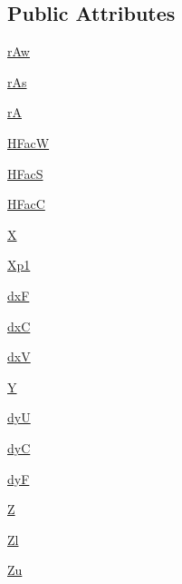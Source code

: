 \subsection*{Public Attributes}
\begin{DoxyCompactItemize}
\item 
\hyperlink{classmitgcm_1_1core_1_1Grid_adbed7b029a384434aca96fc553ded624}{r\+Aw}
\item 
\hyperlink{classmitgcm_1_1core_1_1Grid_a39b86150afe4e5d57702c86329cf3280}{r\+As}
\item 
\hyperlink{classmitgcm_1_1core_1_1Grid_adc031f161f566cb07d37c5a8a24b7e17}{r\+A}
\item 
\hyperlink{classmitgcm_1_1core_1_1Grid_a8c2c688d2378fe573e6e05db31c17cd2}{H\+Fac\+W}
\item 
\hyperlink{classmitgcm_1_1core_1_1Grid_a684f5d212fd29f4eb3432b491b95a82c}{H\+Fac\+S}
\item 
\hyperlink{classmitgcm_1_1core_1_1Grid_a757d09330b819c4650085004dede249e}{H\+Fac\+C}
\item 
\hyperlink{classmitgcm_1_1core_1_1Grid_a7787160106944191d5a4663774854f49}{X}
\item 
\hyperlink{classmitgcm_1_1core_1_1Grid_ab776eda0111565ec823081cfb9654867}{Xp1}
\item 
\hyperlink{classmitgcm_1_1core_1_1Grid_a39285f6f566718178d156838e1c10ee7}{dx\+F}
\item 
\hyperlink{classmitgcm_1_1core_1_1Grid_a5df9ec1a09a18057a0f2f9459fac9375}{dx\+C}
\item 
\hyperlink{classmitgcm_1_1core_1_1Grid_a6d7d2f28292d3b317519fcf83cb8ade9}{dx\+V}
\item 
\hyperlink{classmitgcm_1_1core_1_1Grid_aee6500dc4e99c849fab046c01a3ba25f}{Y}
\item 
\hyperlink{classmitgcm_1_1core_1_1Grid_a7a2b21d780a2a2152bcb381241778964}{dy\+U}
\item 
\hyperlink{classmitgcm_1_1core_1_1Grid_aaed4fc20f0d9bfee00e1da34032d8a98}{dy\+C}
\item 
\hyperlink{classmitgcm_1_1core_1_1Grid_ac6198e01c8d9e3c491afa9c7d2162a45}{dy\+F}
\item 
\hyperlink{classmitgcm_1_1core_1_1Grid_a7486bee7b120f39baa0bc84e663291fe}{Z}
\item 
\hyperlink{classmitgcm_1_1core_1_1Grid_aea2f7ddb0b140ad791b7ce7f96569bd9}{Zl}
\item 
\hyperlink{classmitgcm_1_1core_1_1Grid_a997f5082eb939242633601aa45a28744}{Zu}
\item 

\end{DoxyCompactItemize}
